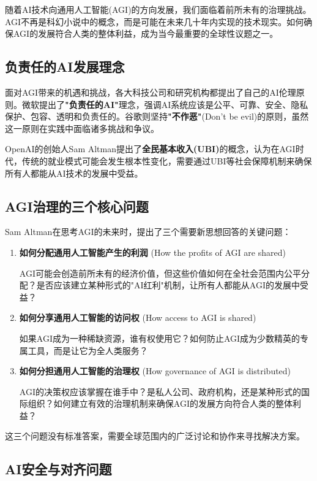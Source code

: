 随着AI技术向通用人工智能(AGI)的方向发展，我们面临着前所未有的治理挑战。AGI不再是科幻小说中的概念，而是可能在未来几十年内实现的技术现实。如何确保AGI的发展符合人类的整体利益，成为当今最重要的全球性议题之一。

\subsection{负责任的AI发展理念}

面对AGI带来的机遇和挑战，各大科技公司和研究机构都提出了自己的AI伦理原则。微软提出了{\bf "负责任的AI"}理念，强调AI系统应该是公平、可靠、安全、隐私保护、包容、透明和负责任的。谷歌则坚持{\bf "不作恶"}(Don't be evil)的原则，虽然这一原则在实践中面临诸多挑战和争议。

OpenAI的创始人Sam Altman提出了{\bf 全民基本收入(UBI)}的概念，认为在AGI时代，传统的就业模式可能会发生根本性变化，需要通过UBI等社会保障机制来确保所有人都能从AI技术的发展中受益。

\subsection{AGI治理的三个核心问题}

Sam Altman在思考AGI的未来时，提出了三个需要新思想回答的关键问题：

\begin{enumerate}
\item {\bf 如何分配通用人工智能产生的利润} (How the profits of AGI are shared)

AGI可能会创造前所未有的经济价值，但这些价值如何在全社会范围内公平分配？是否应该建立某种形式的"AI红利"机制，让所有人都能从AGI的发展中受益？

\item {\bf 如何分享通用人工智能的访问权} (How access to AGI is shared)

如果AGI成为一种稀缺资源，谁有权使用它？如何防止AGI成为少数精英的专属工具，而是让它为全人类服务？

\item {\bf 如何分担通用人工智能的治理权} (How governance of AGI is distributed)

AGI的决策权应该掌握在谁手中？是私人公司、政府机构，还是某种形式的国际组织？如何建立有效的治理机制来确保AGI的发展方向符合人类的整体利益？
\end{enumerate}

这三个问题没有标准答案，需要全球范围内的广泛讨论和协作来寻找解决方案。

\subsection{AI安全与对齐问题}

